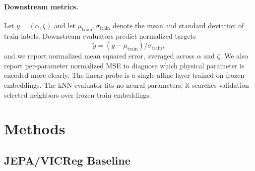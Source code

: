 \documentclass{article}
\begin{document}
\begin{table}[t]
\centering
\caption{Data usage across self-supervised training and downstream evaluation for the final CNext-U-Net run.}
\label{tab:data_usage}
\end{table}

\paragraph{Downstream metrics.}
Let $y=(\alpha,\zeta)$ and let $\mu_{\mathrm{train}},\sigma_{\mathrm{train}}$ denote the mean and standard deviation of train labels. Downstream evaluators predict normalized targets
\begin{equation}
  \tilde{y} = (y-\mu_{\mathrm{train}})/\sigma_{\mathrm{train}},
\end{equation}
and we report normalized mean squared error, averaged across $\alpha$ and $\zeta$. We also report per-parameter normalized MSE to diagnose which physical parameter is encoded more clearly. The linear probe is a single affine layer trained on frozen embeddings. The kNN evaluator fits no neural parameters; it searches validation-selected neighbors over frozen train embeddings.

\section{Methods}

\subsection{JEPA/VICReg Baseline}
\end{document}
